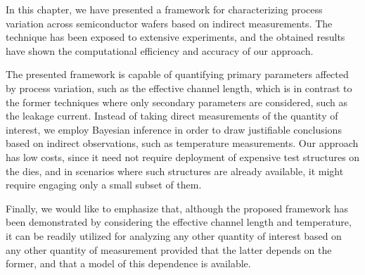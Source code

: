 In this chapter, we have presented a framework for characterizing process
variation across semiconductor wafers based on indirect measurements. The
technique has been exposed to extensive experiments, and the obtained results
have shown the computational efficiency and accuracy of our approach.

The presented framework is capable of quantifying primary parameters affected by
process variation, such as the effective channel length, which is in contrast to
the former techniques where only secondary parameters are considered, such as
the leakage current. Instead of taking direct measurements of the quantity of
interest, we employ Bayesian inference in order to draw justifiable conclusions
based on indirect observations, such as temperature measurements. Our approach
has low costs, since it need not require deployment of expensive test structures
on the dies, and in scenarios where such structures are already available, it
might require engaging only a small subset of them.

Finally, we would like to emphasize that, although the proposed framework has
been demonstrated by considering the effective channel length and temperature,
it can be readily utilized for analyzing any other quantity of interest based on
any other quantity of measurement provided that the latter depends on the
former, and that a model of this dependence is available.
